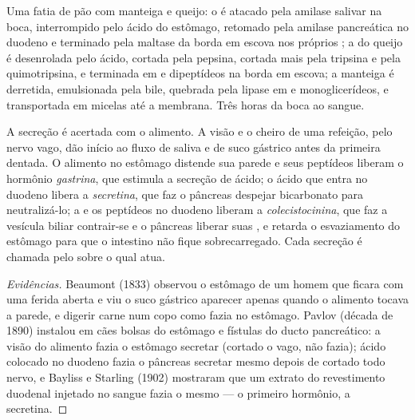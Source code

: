\begin{example}\label{ex:b1:digestion-absorption:meal}
Uma fatia de pão com manteiga e queijo: o  é atacado pela amilase
salivar na boca, interrompido pelo ácido do estômago, retomado pela
amilase pancreática no duodeno e terminado pela maltase da borda em
escova nos próprios ; a  do queijo é desenrolada
pelo ácido, cortada pela pepsina, cortada mais pela tripsina e pela
quimotripsina, e terminada em  e dipeptídeos na borda em
escova; a manteiga é derretida, emulsionada pela bile, quebrada pela
lipase em  e monoglicerídeos, e transportada em micelas
até a membrana. Três horas da boca ao sangue.
\end{example}

\begin{proposition}\label{prop:b1:digestion-absorption:control}
A secreção é acertada com o alimento. A visão e o cheiro de uma
refeição, pelo nervo vago, dão início ao fluxo de saliva e de suco
gástrico antes da primeira dentada. O alimento no estômago distende
sua parede e seus peptídeos liberam o hormônio \emph{gastrina}, que
estimula a secreção de ácido; o ácido que entra no duodeno libera a
\emph{secretina}, que faz o pâncreas despejar bicarbonato para
neutralizá-lo; a  e os peptídeos no duodeno liberam a
\emph{colecistocinina}, que faz a vesícula biliar contrair-se e o
pâncreas liberar suas , e retarda o esvaziamento do estômago
para que o intestino não fique sobrecarregado. Cada secreção é
chamada pelo  sobre o qual atua.
\end{proposition}
\begin{proof}[Evidências]
Beaumont (1833) observou o estômago de um homem que ficara com uma
ferida aberta e viu o suco gástrico aparecer apenas quando o alimento
tocava a parede, e digerir carne num copo como fazia no estômago.
Pavlov (década de 1890) instalou em cães bolsas do estômago e fístulas
do ducto pancreático: a visão do alimento fazia o estômago secretar
(cortado o vago, não fazia); ácido colocado no duodeno fazia o
pâncreas secretar mesmo depois de cortado todo nervo, e Bayliss e
Starling (1902) mostraram que um extrato do revestimento duodenal
injetado no sangue fazia o mesmo --- o primeiro hormônio, a secretina.
\end{proof}

